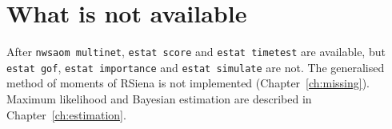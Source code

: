 \section{What is not available}

After \texttt{nwsaom multinet}, \texttt{estat score} and \texttt{estat timetest} are available, but \texttt{estat gof}, \texttt{estat importance} and \texttt{estat simulate} are not. The generalised method of moments of RSiena is not implemented (Chapter~\ref{ch:missing}). Maximum likelihood and Bayesian estimation are described in Chapter~\ref{ch:estimation}.
